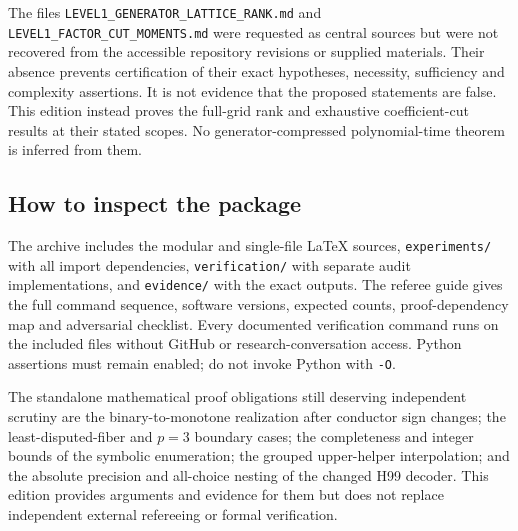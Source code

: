 The files \texttt{LEVEL1\_GENERATOR\_LATTICE\_RANK.md} and
\texttt{LEVEL1\_FACTOR\_CUT\_MOMENTS.md} were requested as central sources
but were not recovered from the accessible repository revisions or supplied
materials. Their absence prevents certification of their exact hypotheses,
necessity, sufficiency and complexity assertions. It is not evidence that
the proposed statements are false. This edition instead proves the full-grid
rank and exhaustive coefficient-cut results at their stated scopes.
No generator-compressed polynomial-time theorem is inferred from them.

\subsection{How to inspect the package}
The archive includes the modular and single-file \LaTeX{} sources,
\texttt{experiments/} with all import dependencies,
\texttt{verification/} with separate audit implementations, and
\texttt{evidence/} with the exact outputs. The referee guide gives the full
command sequence, software versions, expected counts, proof-dependency map
and adversarial checklist. Every documented verification command runs on
the included files without GitHub or research-conversation access.
Python assertions must remain enabled; do not invoke Python with
\texttt{-O}.

The standalone mathematical proof obligations still deserving independent
scrutiny are the binary-to-monotone realization after conductor sign changes;
the least-disputed-fiber and $p=3$ boundary cases; the completeness and integer
bounds of the symbolic enumeration; the grouped upper-helper interpolation;
and the absolute precision and all-choice nesting of the changed H99 decoder.
This edition provides arguments and evidence for them but does not replace
independent external refereeing or formal verification.
